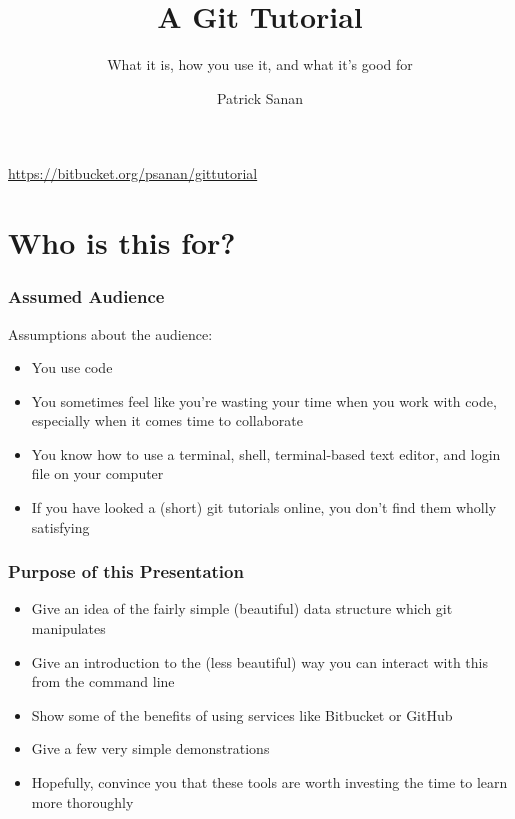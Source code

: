 \documentclass{beamer}
\author{Patrick Sanan}
\institute[USI/ETHZ]
{
ETH Zurich D-ERDW\\
\href{mailto:patrick.sanan@erdw.ethz.ch}{patrick.sanan@erdw.ethz.ch}
}
\title{A Git Tutorial}
\subtitle[]{What it is, how you use it, and what it's good for}
\date[]{}
\begin{document}

\begin{frame}[fragile]
\titlepage
\begin{center}
\href{https://bitbucket.org/psanan/gittutorial}{https://bitbucket.org/psanan/gittutorial}
\end{center}
\end{frame}


\begin{frame}
\tableofcontents
\end{frame}

\section{Who is this for?}
\begin{frame}[fragile]
\frametitle{Assumed Audience}
Assumptions about the audience:
\begin{itemize}
\item You use code
\item You sometimes feel like you're wasting your time when you work with code, especially when it comes time to collaborate
\item You know how to use a terminal, shell, terminal-based text editor, and login file on your computer
\item If you have looked a (short) git tutorials online, you don't find them wholly satisfying
\end{itemize}
\end{frame}

\begin{frame}[fragile]
\frametitle{Purpose of this Presentation}
\begin{itemize}
\item Give an idea of the fairly simple (beautiful) data structure which git manipulates
\item Give an introduction to the (less beautiful) way you can interact with this from the command line
\item Show some of the benefits of using services like Bitbucket or GitHub
\item Give a few very simple demonstrations
\item Hopefully, convince you that these tools are worth investing the time to learn more thoroughly
\end{itemize}
\end{frame}
\end{document}
